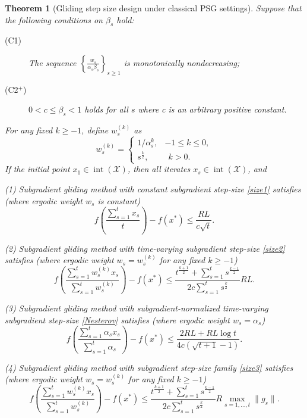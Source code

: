 \documentclass[sn-mathphys]{JORSC-jnl}%
\theoremstyle{thmstyleone}%
\newtheorem{theorem}{Theorem}[section]%
\theoremstyle{thmstylethree}%
\begin{document}
\begin{theorem}[Gliding step size design under classical PSG settings]\label{thm3}
	Suppose that the following conditions on $\beta_s$ hold:
	\begin{description}
		\item[(C1)] The sequence $\left\{ \frac{w_s}{\alpha_s \beta_s} \right\}_{s \ge 1}$ is monotonically nondecreasing;
		\item[(C2$^+$)] $0 < c \leq \beta_s <1$ holds for all $s$ where c is an arbitrary positive constant.
	\end{description}
	For any fixed $k\geq -1$, define $w_s^{(k)}$ as  
	\begin{equation}\label{weight}
		w_s^{(k)} = 
		\begin{cases} 
			1/\alpha_s^k, & -1\leq k \leq 0, \\ 
			s^{\frac{k}{2}}, & ~~k > 0.
		\end{cases}
	\end{equation}
	If the initial point $x_1 \in \operatorname{int}(\mathcal{X})$, then all iterates $x_s \in \operatorname{int}(\mathcal{X})$, and
	
	(1) Subgradient gliding method with constant subgradient step-size \eqref{size1} satisfies (where ergodic weight $w_s$ is constant)   
	\begin{equation}\label{WeakConvergence}
		f\left(\frac{\sum_{s=1}^t x_s}{t}\right)-f(x^*)\leq \frac{RL}{c\sqrt{t}}.
	\end{equation}
	
	(2) Subgradient gliding method with time-varying subgradient step-size \eqref{size2} satisfies (where ergodic weight $w_s = w_s^{(k)}$ for any fixed $k \geq -1$)
	\begin{equation}\label{WeakConvergence1}
		f\left( \frac{\sum_{s=1}^t w_s^{(k)} x_s}{\sum_{s=1}^t w_s^{(k)}} \right) - f(x^*)
		\leq \frac{t^{\frac{k+1}{2}} +\sum_{s=1}^{t} s^{\frac{k-1}{2}}}{2c\sum_{s=1}^{t} s^{\frac{k}{2}}} RL.
	\end{equation}
	
	(3) Subgradient gliding method with subgradient-normalized time-varying subgradient step-size \eqref{Nesterov} satisfies (where ergodic weight $w_s = \alpha_s$)
	\begin{equation}\label{WeakConvergence2}
		f\left(\frac{\sum_{s=1}^t \alpha_s x_s}{\sum_{s=1}^t \alpha_s}\right)-f(x^*)\leq \frac{2RL+RL\log t}{4c(\sqrt{t+1}-1)}.
	\end{equation}
	
	(4) Subgradient gliding method with subgradient step-size family \eqref{size3} satisfies (where ergodic weight $w_s = w_s^{(k)}$ for any fixed $k \geq -1$)   
	\begin{equation}\label{WeakConvergence3}
		f\left( \frac{\sum_{s=1}^t w_s^{(k)} x_s}{\sum_{s=1}^t w_s^{(k)}} \right) - f(x^*)
		\leq \frac{t^{\frac{k+1}{2}} +\sum_{s=1}^{t} s^{\frac{k-1}{2}}}{2c\sum_{s=1}^{t} s^{\frac{k}{2}}} R\max\limits_{s=1,\dots,t}{\|g_s\|}.
	\end{equation}
\end{theorem}
\end{document}
